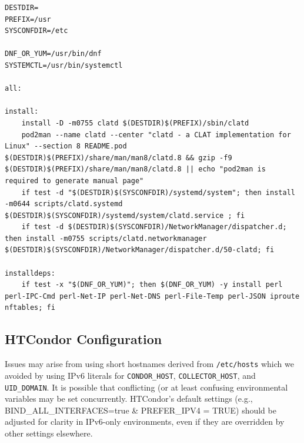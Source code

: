 \documentclass[11pt]{article}
\begin{document}
\begin{lstlisting}[caption={Minimal Makefile for CLATD Installation}, label={lst:clatd-makefile}]
DESTDIR=
PREFIX=/usr
SYSCONFDIR=/etc

DNF_OR_YUM=/usr/bin/dnf
SYSTEMCTL=/usr/bin/systemctl

all:

install:
	install -D -m0755 clatd $(DESTDIR)$(PREFIX)/sbin/clatd
	pod2man --name clatd --center "clatd - a CLAT implementation for Linux" --section 8 README.pod $(DESTDIR)$(PREFIX)/share/man/man8/clatd.8 && gzip -f9 $(DESTDIR)$(PREFIX)/share/man/man8/clatd.8 || echo "pod2man is required to generate manual page"
	if test -d "$(DESTDIR)$(SYSCONFDIR)/systemd/system"; then install -m0644 scripts/clatd.systemd $(DESTDIR)$(SYSCONFDIR)/systemd/system/clatd.service ; fi
	if test -d $(DESTDIR)$(SYSCONFDIR)/NetworkManager/dispatcher.d; then install -m0755 scripts/clatd.networkmanager $(DESTDIR)$(SYSCONFDIR)/NetworkManager/dispatcher.d/50-clatd; fi

installdeps:
	if test -x "$(DNF_OR_YUM)"; then $(DNF_OR_YUM) -y install perl perl-IPC-Cmd perl-Net-IP perl-Net-DNS perl-File-Temp perl-JSON iproute nftables; fi
\end{lstlisting}


\subsection{HTCondor Configuration}
Issues may arise from using short hostnames derived from \texttt{/etc/hosts} which we avoided by using IPv6 literals for \texttt{CONDOR\_HOST}, \texttt{COLLECTOR\_HOST}, and \texttt{UID\_DOMAIN}.
It is possible that conflicting (or at least confusing environmental variables may be set concurrently. HTCondor’s default settings (e.g., BIND\_ALL\_INTERFACES=true \& PREFER\_IPV4 = TRUE) should be adjusted for clarity in IPv6-only environments, even if they are overridden by other settings elsewhere.
\end{document}
